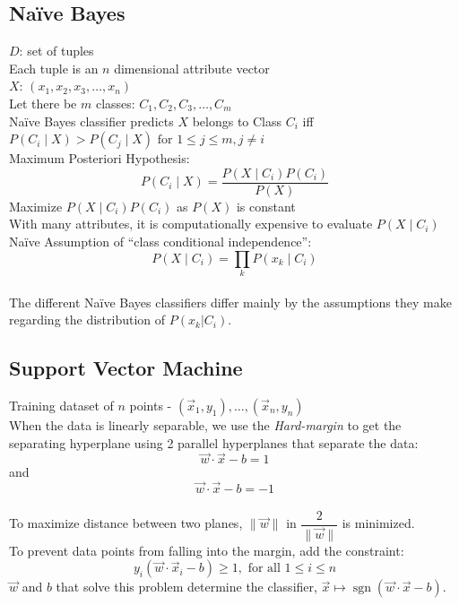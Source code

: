 \documentclass[12pt,oneside,a4paper]{article}
\begin{document}
			\subsection{Na\"ive Bayes}
				
$D$: set of tuples \\
Each tuple is an $n$ dimensional attribute vector \\
$X$: $(x_1, x_2, x_3, \dots, x_n)$ \\
Let there be $m$ classes: $C_1, C_2, C_3, \dots, C_m$ \\
Na\"ive Bayes classifier predicts $X$ belongs to Class $C_i$ iff \\
$P(C_i \mid X) > P(C_j \mid X) \text{ for } 1 \le j \le m, j \neq i$ \\
Maximum Posteriori Hypothesis: \\
$$P(C_i \mid X) = \frac{P(X \mid C_i) P(C_i)}{P(X)}$$
Maximize $P(X \mid C_i) P(C_i)$ as $P(X)$ is constant \\ [10pt]
With many attributes, it is computationally expensive to evaluate $P(X \mid C_i)$ \\ [10pt]
Na\"ive Assumption of ``class conditional independence'': \\
$$P(X \mid C_i) = \prod_k P(x_k \mid C_i)$$ \\
The different Na\"ive Bayes classifiers differ mainly by the assumptions they make regarding the distribution of $P(x_k | C_i).$
			
			\subsection{Support Vector Machine}
		
Training dataset of $n$ points - $(\vec x_1, y_1), \dots, (\vec x_n, y_n)$ \\ [10pt]
When the data is linearly separable, we use the \emph{Hard-margin} to get the separating hyperplane using 2 parallel hyperplanes that separate the data: \\
$$\vec w \cdot \vec x - b = 1$$ and $$\vec w \cdot \vec x - b = -1$$ \\
To maximize distance between two planes, ${\|\vec w\|}$ in ${\dfrac{2}{\|\vec w\|}}$ is minimized. \\ [10pt]
To prevent data points from falling into the margin, add the constraint:
$$y_{i}(\vec w \cdot \vec x_i - b) \ge 1, \text{ for all } 1 \le i \le n$$
$\vec w$ and $b$ that solve this problem determine the classifier, $\vec x \mapsto \operatorname{sgn}(\vec w\cdot \vec x - b)$.
\end{document}
